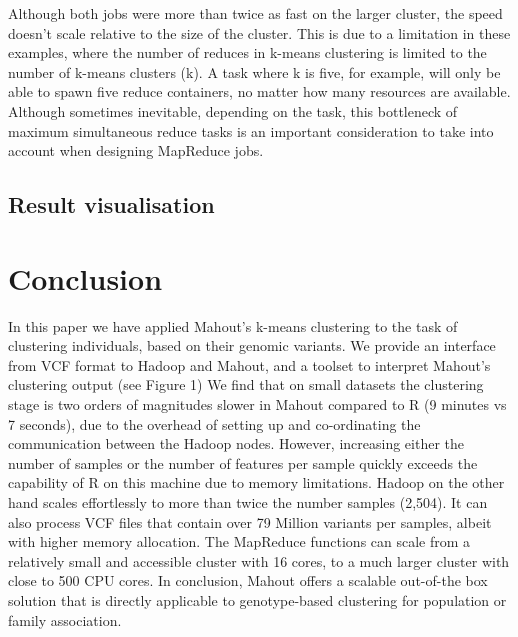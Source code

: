 \documentclass{bioinfo}
\begin{document}
Although both jobs were more than twice as fast on the larger cluster, the speed doesn't scale relative to the size of the cluster. This is due to a limitation in these examples, where the number of reduces in k-means clustering is limited to the number of k-means clusters (k).
A task where k is five, for example, will only be able to spawn five reduce containers, no matter how many resources are available. Although sometimes inevitable, depending on the task, this bottleneck of maximum simultaneous reduce tasks is an important consideration to take into account when designing MapReduce jobs. 



\subsection*{Result visualisation}




\section*{Conclusion}
In this paper we have applied Mahout's k-means clustering to the task of clustering individuals, based on their genomic variants. 
We provide an interface from VCF format to Hadoop and Mahout, and a toolset to interpret Mahout's clustering output (see Figure 1)
We find that on small datasets the clustering stage is two orders of magnitudes slower in Mahout compared to R (9 minutes vs 7 seconds), due to the overhead of setting up and co-ordinating the communication between the Hadoop nodes. 
However, increasing either the number of samples or the number of features per sample quickly exceeds the capability of R on this machine due to memory limitations.
Hadoop on the other hand scales effortlessly to more than twice the number samples (2,504). It can also process VCF files that contain over 79 Million variants per samples, albeit with higher memory allocation.
The MapReduce functions can scale from a relatively small and accessible cluster with 16 cores, to a much larger cluster with close to 500 CPU cores. 
In conclusion, Mahout offers a scalable out-of-the box solution that is directly applicable to genotype-based clustering for population or family association. 
\end{document}
